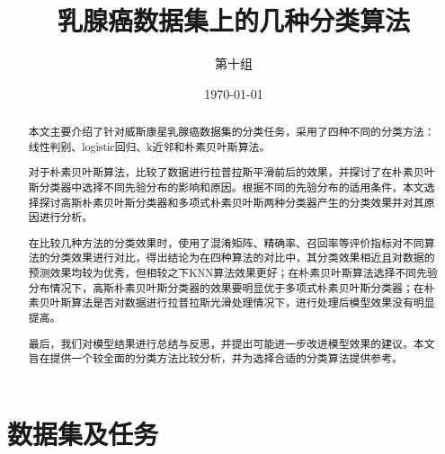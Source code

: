 \documentclass[a4paper,12pt,onecolumn,oneside]{article}
\title{乳腺癌数据集上的几种分类算法}
\author{第十组}
\date{\today}
\begin{document}
	\maketitle
\begin{abstract}
	本文主要介绍了针对威斯康星乳腺癌数据集的分类任务，采用了四种不同的分类方法：线性判别、logistic回归、k近邻和朴素贝叶斯算法。\par 
	对于朴素贝叶斯算法，比较了数据进行拉普拉斯平滑前后的效果，并探讨了在朴素贝叶斯分类器中选择不同先验分布的影响和原因。根据不同的先验分布的适用条件，本文选择探讨高斯朴素贝叶斯分类器和多项式朴素贝叶斯两种分类器产生的分类效果并对其原因进行分析。\par 
	在比较几种方法的分类效果时，使用了混淆矩阵、精确率、召回率等评价指标对不同算法的分类效果进行对比，得出结论为在四种算法的对比中，其分类效果相近且对数据的预测效果均较为优秀，但相较之下KNN算法效果更好；在朴素贝叶斯算法选择不同先验分布情况下，高斯朴素贝叶斯分类器的效果要明显优于多项式朴素贝叶斯分类器；在朴素贝叶斯算法是否对数据进行拉普拉斯光滑处理情况下，进行处理后模型效果没有明显提高。\par 
	最后，我们对模型结果进行总结与反思，并提出可能进一步改进模型效果的建议。本文旨在提供一个较全面的分类方法比较分析，并为选择合适的分类算法提供参考。
\end{abstract}
\newpage
\begin{spacing}{1.2}
\tableofcontents
\end{spacing}
\newpage
\section{数据集及任务}
\end{document}
